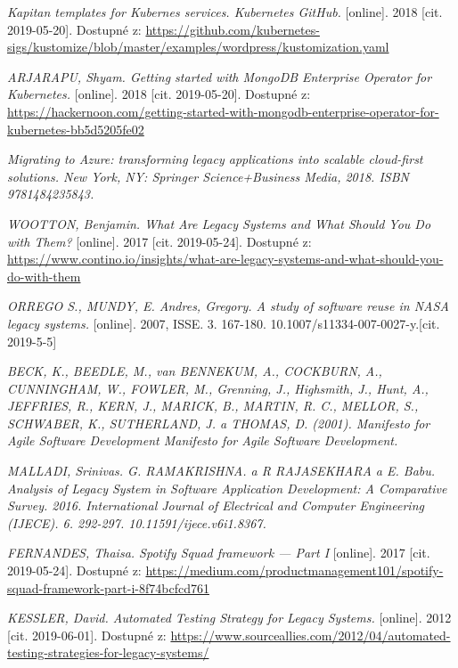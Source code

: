 \begin{thebibliography}{10}
    \emph{Kapitan templates for Kubernes services. Kubernetes GitHub.} [online]. 2018 [cit. 2019-05-20]. Dostupné z: \url{https://github.com/kubernetes-sigs/kustomize/blob/master/examples/wordpress/kustomization.yaml}  

	\emph{ARJARAPU, Shyam. Getting started with MongoDB Enterprise Operator for Kubernetes.} [online]. 2018 [cit. 2019-05-20]. Dostupné z: \url{https://hackernoon.com/getting-started-with-mongodb-enterprise-operator-for-kubernetes-bb5d5205fe02}

    \emph{Migrating to Azure: transforming legacy applications into scalable cloud-first solutions. New York, NY: Springer Science+Business Media, 2018. ISBN 9781484235843.} 

    \emph{WOOTTON, Benjamin. What Are Legacy Systems and What Should You Do with Them?} [online]. 2017 [cit. 2019-05-24]. Dostupné z: \url{https://www.contino.io/insights/what-are-legacy-systems-and-what-should-you-do-with-them} 
    
    \emph{ORREGO S., MUNDY, E. Andres, Gregory.  A study of software reuse in NASA legacy systems.} [online]. 2007, ISSE. 3. 167-180. 10.1007/s11334-007-0027-y.[cit. 2019-5-5]

    \emph{BECK, K., BEEDLE, M., van BENNEKUM, A., COCKBURN, A., CUNNINGHAM, W., FOWLER, M., Grenning, J., Highsmith, J., Hunt, A., JEFFRIES, R., KERN, J., MARICK, B., MARTIN, R. C., MELLOR, S., SCHWABER, K., SUTHERLAND, J. a THOMAS, D. (2001). Manifesto for Agile Software Development Manifesto for Agile Software Development.} 

    \emph{MALLADI, Srinivas. G. RAMAKRISHNA. a R RAJASEKHARA a E. Babu. Analysis of Legacy System in Software Application Development: A Comparative Survey. 2016. International Journal of Electrical and Computer Engineering (IJECE). 6. 292-297. 10.11591/ijece.v6i1.8367.}


    \emph{FERNANDES, Thaisa. Spotify Squad framework — Part I} [online]. 2017 [cit. 2019-05-24]. Dostupné z: \url{https://medium.com/productmanagement101/spotify-squad-framework-part-i-8f74bcfcd761} 

    \emph{KESSLER, David. Automated Testing Strategy for Legacy Systems.} [online]. 2012 [cit. 2019-06-01]. Dostupné z: \url{https://www.sourceallies.com/2012/04/automated-testing-strategies-for-legacy-systems/} 
 

\end{thebibliography}
